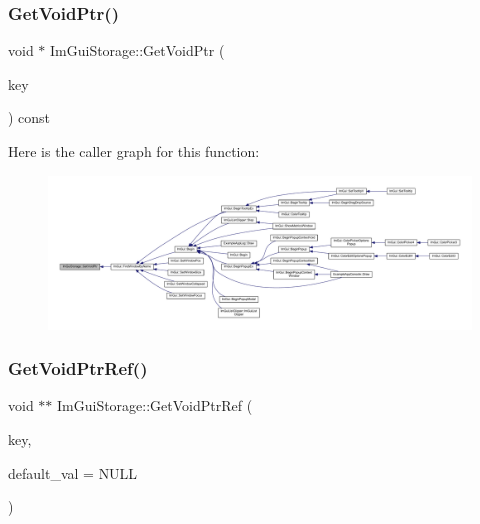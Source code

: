 \subsubsection{\texorpdfstring{Get\+Void\+Ptr()}{GetVoidPtr()}}
{\footnotesize\ttfamily void $\ast$ Im\+Gui\+Storage\+::\+Get\+Void\+Ptr (\begin{DoxyParamCaption}\item[{\mbox{\hyperlink{imgui_8h_a1785c9b6f4e16406764a85f32582236f}{Im\+Gui\+ID}}}]{key }\end{DoxyParamCaption}) const}

Here is the caller graph for this function\+:
\nopagebreak
\begin{figure}[H]
\begin{center}
\leavevmode
\includegraphics[width=350pt]{struct_im_gui_storage_aaf87a98ede89da09113b0189f6d878ca_icgraph}
\end{center}
\end{figure}
\mbox{\label{struct_im_gui_storage_a2b203317f3f488818e9b9f416fe35332}} 
\subsubsection{\texorpdfstring{Get\+Void\+Ptr\+Ref()}{GetVoidPtrRef()}}
{\footnotesize\ttfamily void $\ast$$\ast$ Im\+Gui\+Storage\+::\+Get\+Void\+Ptr\+Ref (\begin{DoxyParamCaption}\item[{\mbox{\hyperlink{imgui_8h_a1785c9b6f4e16406764a85f32582236f}{Im\+Gui\+ID}}}]{key,  }\item[{void $\ast$}]{default\+\_\+val = {\ttfamily NULL} }\end{DoxyParamCaption})}

\mbox{\label{struct_im_gui_storage_ae5ee60618c4ce8e2b4ce0e5543d52992}} 
